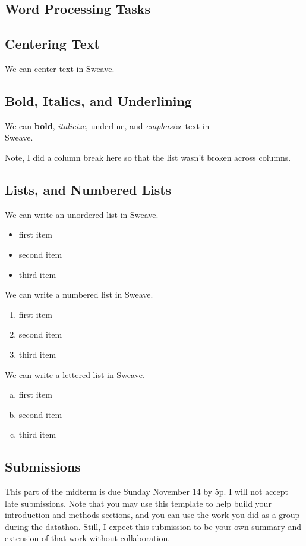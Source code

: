 \documentclass{article}\usepackage[]{graphicx}\usepackage[]{xcolor}
\begin{document}
\begin{multicols}{2}
\section{Word Processing Tasks}
\subsection{Centering Text}
\begin{center}
We can center text in Sweave.
\end{center}

\subsection{Bold, Italics, and Underlining}
We can \textbf{bold}, \textit{italicize}, \underline{underline}, and \emph{emphasize} text in \\ Sweave. 

Note, I did a column break here so that the list wasn’t
broken across columns.
\subsection{Lists, and Numbered Lists}
We can write an unordered list in Sweave.
\begin{itemize}
  \item first item
  \item second item
  \item third item
\end{itemize}
We can write a numbered list in Sweave.
\begin{enumerate}
  \item first item
  \item second item
  \item third item
\end{enumerate}
We can write a lettered list in Sweave.
\begin{enumerate}[a.]
  \item first item
  \item second item
  \item third item
\end{enumerate}
\subsection{Submissions}
This part of the midterm is due Sunday November 14 by 5p.
I will not accept late submissions. Note that you may use
this template to help build your introduction and methods
sections, and you can use the work you did as a group during
the datathon. Still, I expect this submission to be your own
summary and extension of that work without collaboration.


\end{multicols}
\end{document}
